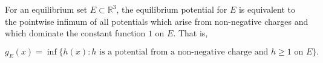For an equilibrium set $E \subset \mathbb{R}^3$, the equilibrium potential for $E$ is equivalent to the pointwise infimum of all potentials which arise from non-negative charges and which dominate the constant function $1$ on $E$. That is,

$$g_E(x) = \inf \{ h(x) : h \text{ is a potential from a non-negative charge and } h \geq 1 \text{ on } E \}.$$
